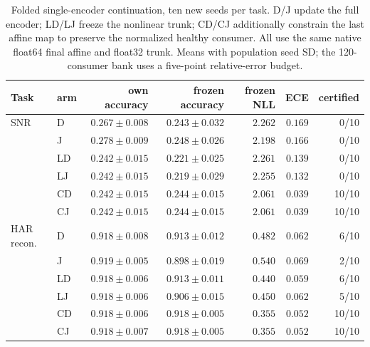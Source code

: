 \begin{table}[t]
\centering
\caption{Folded single-encoder continuation, ten new seeds per task. D/J update the full encoder; LD/LJ freeze the nonlinear trunk; CD/CJ additionally constrain the last affine map to preserve the normalized healthy consumer. All use the same native float64 final affine and float32 trunk. Means with population seed SD; the 120-consumer bank uses a five-point relative-error budget.}
\label{tab:compiled_full}
\small
\begin{tabular}{llrrrrr}
\toprule
Task & arm & own accuracy & frozen accuracy & frozen NLL & ECE & certified \\
\midrule
SNR & D & $0.267\pm0.008$ & $0.243\pm0.032$ & $2.262$ & $0.169$ & 0/10 \\
 & J & $0.278\pm0.009$ & $0.248\pm0.026$ & $2.198$ & $0.166$ & 0/10 \\
 & LD & $0.242\pm0.015$ & $0.221\pm0.025$ & $2.261$ & $0.139$ & 0/10 \\
 & LJ & $0.242\pm0.015$ & $0.219\pm0.029$ & $2.255$ & $0.132$ & 0/10 \\
 & CD & $0.242\pm0.015$ & $0.244\pm0.015$ & $2.061$ & $0.039$ & 10/10 \\
 & CJ & $0.242\pm0.015$ & $0.244\pm0.015$ & $2.061$ & $0.039$ & 10/10 \\
\midrule
HAR recon. & D & $0.918\pm0.008$ & $0.913\pm0.012$ & $0.482$ & $0.062$ & 6/10 \\
 & J & $0.919\pm0.005$ & $0.898\pm0.019$ & $0.540$ & $0.069$ & 2/10 \\
 & LD & $0.918\pm0.006$ & $0.913\pm0.011$ & $0.440$ & $0.059$ & 6/10 \\
 & LJ & $0.918\pm0.006$ & $0.906\pm0.015$ & $0.450$ & $0.062$ & 5/10 \\
 & CD & $0.918\pm0.006$ & $0.918\pm0.005$ & $0.355$ & $0.052$ & 10/10 \\
 & CJ & $0.918\pm0.007$ & $0.918\pm0.005$ & $0.355$ & $0.052$ & 10/10 \\
\bottomrule
\end{tabular}
\end{table}
